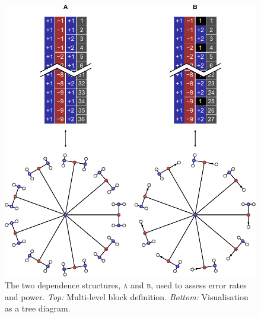 \begin{figure}[!p]
\centering
\includegraphics{figures/treesAB.pdf}
\vspace{1cm}
\caption[The two simulated dependence structures used to assess error rates and power.]{The two dependence structures, \textsc{a} and \textsc{b}, used to assess error rates and power.
\emph{Top:} Multi-level block definition.
\emph{Bottom:} Visualisation as a tree diagram.} 
\label{fig:treesAB}
\end{figure}

